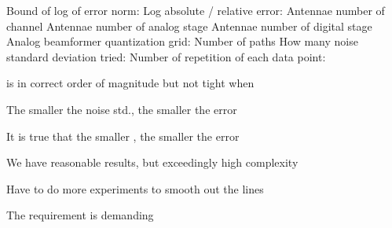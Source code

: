 {
\I Bound of log of error norm:
\I Log absolute / relative error:
}
{
\I Antennae number of channel 
\I Antennae number of analog stage 
\I Antennae number of digital stage 
\I Analog beamformer quantization grid: 
\I Number of paths 
\I How many noise standard deviation tried: 
\I Number of repetition of each data point: 
}
{
\blank [big]
}
{
\blank [big]
}
{
\blank [big]
}
{
\blank [big]
}
{
\blank [big]
}
{
\blank [big]
}
{

\I {} is in correct order of magnitude but not tight when 

\I The smaller the noise std., the smaller the error

\I It is  true that the smaller , the smaller the error

\I We have reasonable results, but exceedingly high complexity

\I Have to do more experiments to smooth out the lines

\I The requirement  is demanding
}

